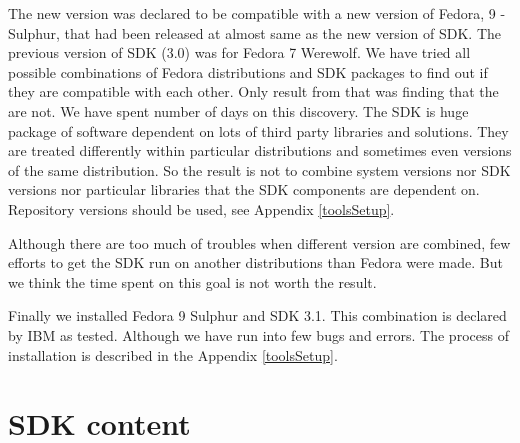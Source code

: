 \par
The new version was declared to be compatible with a new version of Fedora, 9 - Sulphur, that had been released at almost same as the new version of SDK.
The previous version of SDK (3.0) was for Fedora 7 Werewolf.
We have tried all possible combinations of Fedora distributions and SDK packages to find out if they are compatible with each other.
Only result from that was finding that the are not.
We have spent number of days on this discovery.
The SDK is huge package of software dependent on lots of third party libraries and solutions.
They are treated differently within particular distributions and sometimes even versions of the same distribution.
So the result is not to combine system versions nor SDK versions nor particular libraries that the SDK components are dependent on.
Repository versions should be used, see Appendix \ref{toolsSetup}.

\par
Although there are too much of troubles when different version are combined, few efforts to get the SDK run on another distributions than Fedora were made.
But we think the time spent on this goal is not worth the result.

\par
Finally we installed Fedora 9 Sulphur and SDK 3.1.
This combination is declared by IBM as tested.
Although we have run into few bugs and errors.
The process of installation is described in the Appendix \ref{toolsSetup}.

\section {SDK content}

